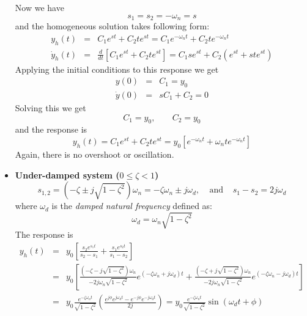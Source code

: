 \documentclass{article}
\begin{document}
\begin{itemize}
  Now we have
  \begin{equation} 
    s_1=s_2=-\omega_n=s 
  \end{equation}
  and the homogeneous solution takes following form:
  \begin{eqnarray}
    y_h(t)&=&C_1 e^{st}+C_2 t e^{st}=C_1 e^{-\omega_nt}+C_2 t e^{-\omega_nt} 
    \nonumber \\
    \dot{y}_h(t)&=&\frac{d}{dt}[C_1 e^{st}+C_2 t e^{st}]=C_1se^{st}+C_2(e^{st}+ste^{st})  
  \end{eqnarray}
  Applying the initial conditions to this response we get
  \begin{eqnarray}
    y(0)&=&C_1=y_0  \nonumber \\
    \dot{y}(0)&=&s C_1+C_2=0 
  \end{eqnarray}
  Solving this we get 
  \begin{equation} 
    C_1=y_0, \;\;\;\;\;\;\;C_2=y_0
  \end{equation}
  and the response is
  \begin{equation} 
    y_h(t)=C_1 e^{st}+C_2 t e^{st}=y_0\left[ e^{-\omega_nt}+\omega_n t e^{-\omega_nt}\right]
  \end{equation}
  Again, there is no overshoot or oscillation.
\item {\bf Under-damped system ($0 \le \zeta < 1$)}
  \begin{equation} 
    s_{1,2}=(-\zeta\pm j \sqrt{1-\zeta^2})\omega_n=-\zeta\omega_n\pm j\omega_d,
    \;\;\;\;\mbox{and}\;\;\;\;
    s_1-s_2=2j\omega_d  
  \end{equation}
  where $\omega_d$ is the {\em damped natural frequency} defined as:
  \begin{equation}
    \omega_d=\omega_n\sqrt{1-\zeta^2} 
  \end{equation}
  The response is
  \begin{eqnarray}
    y_h(t)&=&y_0 \left[ \frac{s_2 e^{s_1t}}{s_2-s_1}+\frac{s_1 e^{s_2t}}{s_1-s_2} \right]
    \nonumber \\
    &=&y_0\left[ \frac{(-\zeta-j\sqrt{1-\zeta^2})\omega_n}{-2j\omega_n\sqrt{1-\zeta^2}} e^{(-\zeta\omega_n+j\omega_d)t}
                +\frac{(-\zeta+j\sqrt{1-\zeta^2})\omega_n}{-2j\omega_n\sqrt{1-\zeta^2}} e^{(-\zeta\omega_n-j\omega_d)t} \right]
    \nonumber \\
    &=&y_0\frac{e^{-\zeta\omega_nt}}{\sqrt{1-\zeta^2}} \left(\frac{e^{j\phi}e^{j\omega_dt}-e^{-j\phi}e^{-j\omega_dt}}{2j}\right)
    =y_0\frac{e^{-\zeta\omega_nt}}{\sqrt{1-\zeta^2}} \sin(\omega_dt+\phi)
  \end{eqnarray}

\end{itemize}
\end{document}
